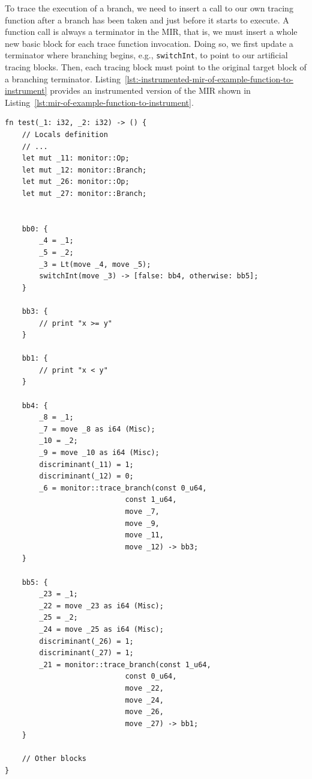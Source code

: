 \documentclass{article}
\begin{document}
To trace the execution of a branch, we need to insert a call to our own tracing function after a branch has been taken and just before it starts to execute. A function call is always a terminator in the \ac{MIR}, that is, we must insert a whole new basic block for each trace function invocation. Doing so, we first update a terminator where branching begins, e.g., \lstinline{switchInt}, to point to our artificial tracing blocks. Then, each tracing block must point to the original target block of a branching terminator. Listing~\ref{lst:-instrumented-mir-of-example-function-to-instrument} provides an instrumented version of the \ac{MIR} shown in Listing~\ref{lst:mir-of-example-function-to-instrument}. 
\begin{lstlisting}[language={}, style=boxed, caption={Instrumented MIR of the \lstinline{foo} function}, label=lst:-instrumented-mir-of-example-function-to-instrument]
fn test(_1: i32, _2: i32) -> () {
    // Locals definition
    // ...
    let mut _11: monitor::Op;
    let mut _12: monitor::Branch;  
    let mut _26: monitor::Op;
    let mut _27: monitor::Branch;


    bb0: {
        _4 = _1;                         
        _5 = _2;                       
        _3 = Lt(move _4, move _5);      
        switchInt(move _3) -> [false: bb4, otherwise: bb5]; 
    }

    bb3: {
        // print "x >= y"
    }

    bb1: {
        // print "x < y"
    }

    bb4: {
        _8 = _1;                         
        _7 = move _8 as i64 (Misc);      
        _10 = _2;                        
        _9 = move _10 as i64 (Misc);
        discriminant(_11) = 1;
        discriminant(_12) = 0;
        _6 = monitor::trace_branch(const 0_u64, 
                            const 1_u64, 
                            move _7, 
                            move _9, 
                            move _11, 
                            move _12) -> bb3;
    }

    bb5: {
        _23 = _1;
        _22 = move _23 as i64 (Misc);
        _25 = _2;
        _24 = move _25 as i64 (Misc);
        discriminant(_26) = 1;
        discriminant(_27) = 1;
        _21 = monitor::trace_branch(const 1_u64, 
                            const 0_u64, 
                            move _22, 
                            move _24, 
                            move _26, 
                            move _27) -> bb1;
    }

    // Other blocks
}
\end{lstlisting}
\end{document}
